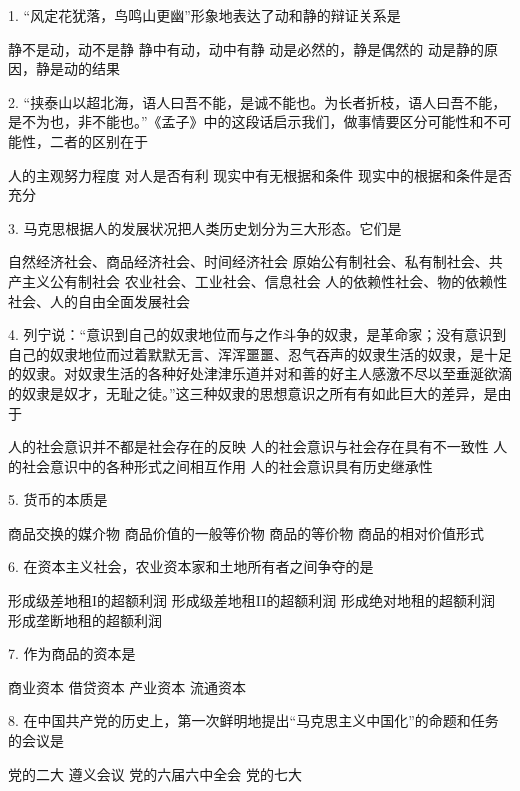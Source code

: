 1. “风定花犹落，鸟鸣山更幽”形象地表达了动和静的辩证关系是
\begin{choices}
	 静不是动，动不是静
	 静中有动，动中有静
	 动是必然的，静是偶然的
	 动是静的原因，静是动的结果
\end{choices}
2. “挟泰山以超北海，语人曰吾不能，是诚不能也。为长者折枝，语人曰吾不能，是不为也，非不能也。”《孟子》中的这段话启示我们，做事情要区分可能性和不可能性，二者的区别在于
\begin{choices}
	 人的主观努力程度
	 对人是否有利
	 现实中有无根据和条件
	 现实中的根据和条件是否充分
\end{choices}
3. 马克思根据人的发展状况把人类历史划分为三大形态。它们是
\begin{choices}
	 自然经济社会、商品经济社会、时间经济社会
	 原始公有制社会、私有制社会、共产主义公有制社会
	 农业社会、工业社会、信息社会
	 人的依赖性社会、物的依赖性社会、人的自由全面发展社会
\end{choices}
4. 列宁说：“意识到自己的奴隶地位而与之作斗争的奴隶，是革命家；没有意识到自己的奴隶地位而过着默默无言、浑浑噩噩、忍气吞声的奴隶生活的奴隶，是十足的奴隶。对奴隶生活的各种好处津津乐道并对和善的好主人感激不尽以至垂涎欲滴的奴隶是奴才，无耻之徒。”这三种奴隶的思想意识之所有有如此巨大的差异，是由于
\begin{choices}
	 人的社会意识并不都是社会存在的反映
	 人的社会意识与社会存在具有不一致性
	 人的社会意识中的各种形式之间相互作用
	 人的社会意识具有历史继承性
\end{choices}
5. 货币的本质是
\begin{choices}
	 商品交换的媒介物
	 商品价值的一般等价物
	 商品的等价物
	 商品的相对价值形式
\end{choices}
6. 在资本主义社会，农业资本家和土地所有者之间争夺的是
\begin{choices}
	 形成级差地租I的超额利润
	 形成级差地租II的超额利润
	 形成绝对地租的超额利润
	 形成垄断地租的超额利润
\end{choices}
7. 作为商品的资本是
\begin{choices}
	 商业资本
	 借贷资本
	 产业资本
	 流通资本
\end{choices}
8. 在中国共产党的历史上，第一次鲜明地提出“马克思主义中国化”的命题和任务的会议是
\begin{choices}
	 党的二大
	 遵义会议
	 党的六届六中全会
	 党的七大
\end{choices}
